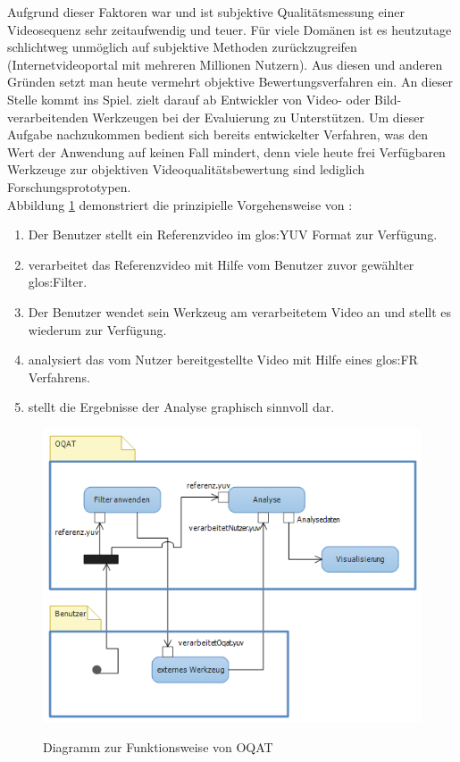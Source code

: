 Aufgrund dieser Faktoren war und ist subjektive Qualitätsmessung einer Videosequenz sehr zeitaufwendig und
teuer. Für viele Domänen ist es heutzutage schlichtweg unmöglich auf subjektive Methoden zurückzugreifen
(Internetvideoportal mit mehreren Millionen Nutzern). Aus diesen und anderen Gründen setzt man heute 
vermehrt objektive Bewertungsverfahren ein.
\newpage
An dieser Stelle kommt \projektTitel ins Spiel. \projektTitel zielt darauf ab Entwickler von
Video- oder Bild-verarbeitenden Werkzeugen bei der Evaluierung zu Unterstützen. Um dieser Aufgabe
nachzukommen bedient sich \projektTitel bereits entwickelter Verfahren, was den Wert der Anwendung
auf keinen Fall mindert, denn viele heute frei Verfügbaren Werkzeuge zur objektiven Videoqualitätsbewertung
sind lediglich Forschungsprototypen. \\
Abbildung \ref{grobFunk} demonstriert die prinzipielle Vorgehensweise von \projektTitel:
\begin{enumerate}
\item Der Benutzer stellt \projektTitel ein Referenzvideo im \gls{glos:YUV} Format zur Verfügung.
\item \projektTitel verarbeitet das Referenzvideo mit Hilfe vom Benutzer zuvor gewählter \gls{glos:Filter}.
\item Der Benutzer wendet sein Werkzeug am verarbeitetem Video an und stellt es wiederum  \projektTitel zur Verfügung.
\item \projektTitel analysiert das vom Nutzer bereitgestellte Video mit Hilfe eines \gls{glos:FR} Verfahrens.
\item \projektTitel stellt die Ergebnisse der Analyse graphisch sinnvoll dar.
\end{enumerate}
\begin{figure}[h]
\includegraphics[scale=1]{bilder/einleitung.png}
\label{grobFunk}
\caption{Diagramm zur Funktionsweise von \gls{OQAT}}
\end{figure}

